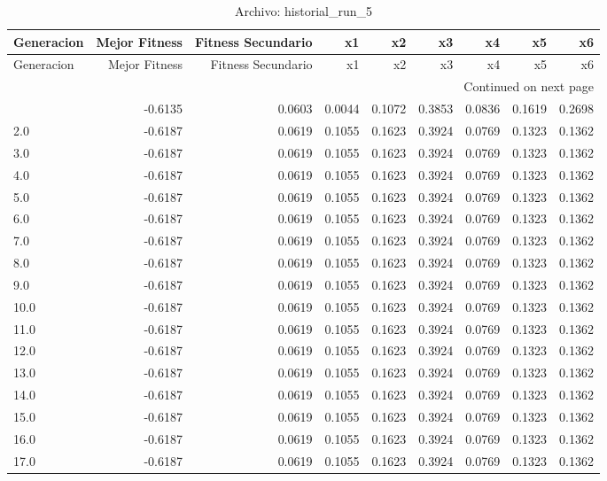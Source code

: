 \begin{longtable}{lrrrrrrrr}
\caption{Archivo: historial\_run\_5}\label{tab:historial_run_5} \\
\toprule
Generacion & Mejor Fitness & Fitness Secundario & x1 & x2 & x3 & x4 & x5 & x6 \\
\midrule
\endfirsthead
\toprule
Generacion & Mejor Fitness & Fitness Secundario & x1 & x2 & x3 & x4 & x5 & x6 \\
\midrule
\endhead
\midrule
\multicolumn{9}{r}{Continued on next page} \\
\midrule
\endfoot
\bottomrule
\endlastfoot
1.0 & -0.6135 & 0.0603 & 0.0044 & 0.1072 & 0.3853 & 0.0836 & 0.1619 & 0.2698 \\
2.0 & -0.6187 & 0.0619 & 0.1055 & 0.1623 & 0.3924 & 0.0769 & 0.1323 & 0.1362 \\
3.0 & -0.6187 & 0.0619 & 0.1055 & 0.1623 & 0.3924 & 0.0769 & 0.1323 & 0.1362 \\
4.0 & -0.6187 & 0.0619 & 0.1055 & 0.1623 & 0.3924 & 0.0769 & 0.1323 & 0.1362 \\
5.0 & -0.6187 & 0.0619 & 0.1055 & 0.1623 & 0.3924 & 0.0769 & 0.1323 & 0.1362 \\
6.0 & -0.6187 & 0.0619 & 0.1055 & 0.1623 & 0.3924 & 0.0769 & 0.1323 & 0.1362 \\
7.0 & -0.6187 & 0.0619 & 0.1055 & 0.1623 & 0.3924 & 0.0769 & 0.1323 & 0.1362 \\
8.0 & -0.6187 & 0.0619 & 0.1055 & 0.1623 & 0.3924 & 0.0769 & 0.1323 & 0.1362 \\
9.0 & -0.6187 & 0.0619 & 0.1055 & 0.1623 & 0.3924 & 0.0769 & 0.1323 & 0.1362 \\
10.0 & -0.6187 & 0.0619 & 0.1055 & 0.1623 & 0.3924 & 0.0769 & 0.1323 & 0.1362 \\
11.0 & -0.6187 & 0.0619 & 0.1055 & 0.1623 & 0.3924 & 0.0769 & 0.1323 & 0.1362 \\
12.0 & -0.6187 & 0.0619 & 0.1055 & 0.1623 & 0.3924 & 0.0769 & 0.1323 & 0.1362 \\
13.0 & -0.6187 & 0.0619 & 0.1055 & 0.1623 & 0.3924 & 0.0769 & 0.1323 & 0.1362 \\
14.0 & -0.6187 & 0.0619 & 0.1055 & 0.1623 & 0.3924 & 0.0769 & 0.1323 & 0.1362 \\
15.0 & -0.6187 & 0.0619 & 0.1055 & 0.1623 & 0.3924 & 0.0769 & 0.1323 & 0.1362 \\
16.0 & -0.6187 & 0.0619 & 0.1055 & 0.1623 & 0.3924 & 0.0769 & 0.1323 & 0.1362 \\
17.0 & -0.6187 & 0.0619 & 0.1055 & 0.1623 & 0.3924 & 0.0769 & 0.1323 & 0.1362 \\

\end{longtable}
